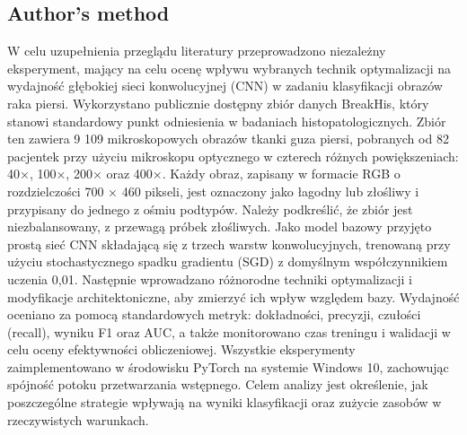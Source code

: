 \subsection{Author's method}
W celu uzupełnienia przeglądu literatury przeprowadzono niezależny eksperyment, mający na celu ocenę wpływu wybranych technik optymalizacji na wydajność głębokiej sieci konwolucyjnej (CNN) w zadaniu klasyfikacji obrazów raka piersi. Wykorzystano publicznie dostępny zbiór danych BreakHis, który stanowi standardowy punkt odniesienia w badaniach histopatologicznych. Zbiór ten zawiera 9 109 mikroskopowych obrazów tkanki guza piersi, pobranych od 82 pacjentek przy użyciu mikroskopu optycznego w czterech różnych powiększeniach: 40×, 100×, 200× oraz 400×. Każdy obraz, zapisany w formacie RGB o rozdzielczości 700 × 460 pikseli, jest oznaczony jako łagodny lub złośliwy i przypisany do jednego z ośmiu podtypów. Należy podkreślić, że zbiór jest niezbalansowany, z przewagą próbek złośliwych.
Jako model bazowy przyjęto prostą sieć CNN składającą się z trzech warstw konwolucyjnych, trenowaną przy użyciu stochastycznego spadku gradientu (SGD) z domyślnym współczynnikiem uczenia 0,01. Następnie wprowadzano różnorodne techniki optymalizacji i modyfikacje architektoniczne, aby zmierzyć ich wpływ względem bazy. Wydajność oceniano za pomocą standardowych metryk: dokładności, precyzji, czułości (recall), wyniku F1 oraz AUC, a także monitorowano czas treningu i walidacji w celu oceny efektywności obliczeniowej. Wszystkie eksperymenty zaimplementowano w środowisku PyTorch na systemie Windows 10, zachowując spójność potoku przetwarzania wstępnego. Celem analizy jest określenie, jak poszczególne strategie wpływają na wyniki klasyfikacji oraz zużycie zasobów w rzeczywistych warunkach.

